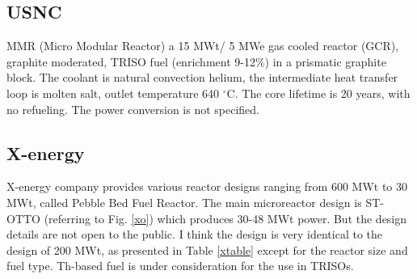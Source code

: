 \subsection{USNC}
MMR (Micro Modular Reactor) a 15 MWt/ 5 MWe gas cooled reactor (GCR),  graphite moderated, TRISO fuel (enrichment 9-12\%) in  a  prismatic  graphite block. The coolant is natural convection helium, the intermediate heat transfer loop is molten salt, outlet temperature 640 $^\circ{}$C. The core lifetime is 20 years, with no refueling. The power conversion is not specified.

\pagebreak
\subsection{X-energy}
X-energy company provides various reactor designs ranging from 600 MWt to 30 MWt, called Pebble Bed Fuel Reactor. The main microreactor design is ST-OTTO (referring to Fig.  \ref{xo}) which produces 30-48 MWt power. But the design details are not open to the public. I think the design is very identical to the design of 200 MWt, as presented in Table \ref{xtable} except for the reactor size and fuel type. Th-based fuel is under consideration for the use in TRISOs. 


